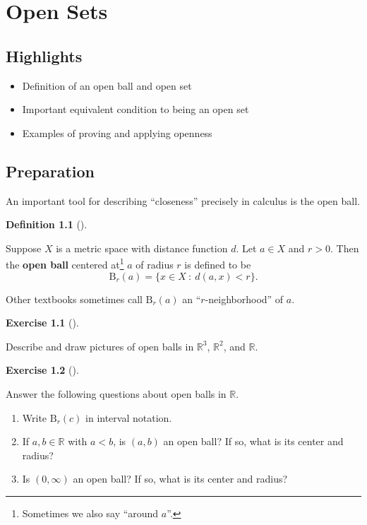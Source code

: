 \documentclass[
  letterpaper,
  DIV=11,
  numbers=noendperiod]{scrreprt}
\providecommand{\tightlist}{%
  \setlength{\itemsep}{0pt}\setlength{\parskip}{0pt}}
\def\R{\mathbb R}
\newcommand{\st}{~:~}
\newcommand{\bee}{\mathrm{B}}
\theoremstyle{plain}
\theoremstyle{definition}
\newtheorem{exercise}{Exercise}[chapter]
\theoremstyle{plain}
\theoremstyle{plain}
\theoremstyle{definition}
\theoremstyle{definition}
\newtheorem{definition}{Definition}[chapter]
\theoremstyle{remark}
\begin{document}
\chapter{Open Sets}\label{open-sets}

\section*{Highlights}\label{highlights-5}


\begin{itemize}
\tightlist
\item
  Definition of an open ball and open set
\item
  Important equivalent condition to being an open set
\item
  Examples of proving and applying openness
\end{itemize}

\section{Preparation}\label{preparation-5}

An important tool for describing ``closeness'' precisely in calculus is
the open ball.

\begin{definition}[]\protect\hypertarget{def-open-ball}{}\label{def-open-ball}

Suppose \(X\) is a metric space with distance function \(d\). Let
\(a\in X\) and \(r>0\). Then the \textbf{open ball} centered
at\footnote{Sometimes we also say ``around \(a\)''.} \(a\) of radius
\(r\) is defined to be \[\bee_r(a)=\{x\in X\st d(a,x)<r\}.\]

\end{definition}

Other textbooks sometimes call \(\bee_r(a)\) an ``\(r\)-neighborhood''
of \(a\).

\begin{exercise}[]\protect\hypertarget{exr-open-balls-sketch}{}\label{exr-open-balls-sketch}

Describe and draw pictures of open balls in \(\R^3\), \(\R^2\), and
\(\R\).

\end{exercise}

\begin{exercise}[]\protect\hypertarget{exr-open-balls-in-r}{}\label{exr-open-balls-in-r}

Answer the following questions about open balls in \(\R\).

\begin{enumerate}
\def\labelenumi{\arabic{enumi}.}
\tightlist
\item
  Write \(\bee_r(c)\) in interval notation.
\item
  If \(a,b\in\R\) with \(a<b\), is \((a,b)\) an open ball? If so, what
  is its center and radius?
\item
  Is \((0,\infty)\) an open ball? If so, what is its center and radius?
\end{enumerate}

\end{exercise}
\end{document}
